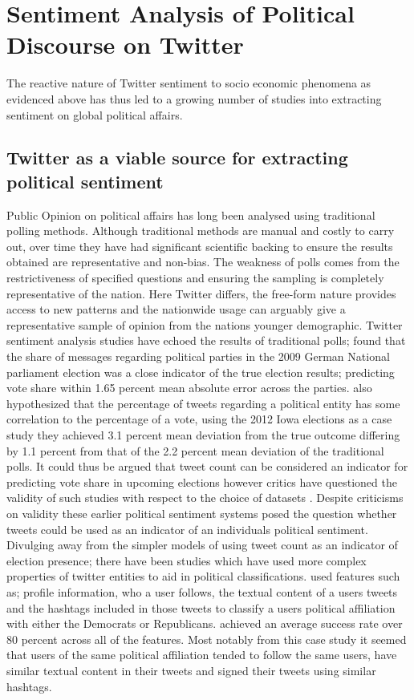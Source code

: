 \documentclass[11pt]{report}
\begin{document}
\section{Sentiment Analysis of Political Discourse on Twitter}
The reactive nature of Twitter sentiment to socio economic phenomena as evidenced above has thus led to a growing number of studies into extracting sentiment on global political affairs.
\subsection*{Twitter as a viable source for extracting political sentiment}
Public Opinion on political affairs has long been analysed using traditional polling methods. Although traditional methods are manual and costly to carry out, over time they have had significant scientific backing to ensure the results obtained are representative and non-bias. The weakness of polls comes from the restrictiveness of specified questions and ensuring the sampling is completely representative of the nation. Here Twitter differs, the free-form nature provides access to new patterns and the nationwide usage can arguably give a representative sample of opinion from the nations younger demographic. Twitter sentiment analysis studies have echoed the results of traditional polls; \cite{tumasjan_predicting_2010} found that the share of messages regarding political parties in the 2009 German National parliament election was a close indicator of the true election results; predicting vote share within 1.65 percent mean absolute error across the parties.  \cite{jensen_psephological_2013} also hypothesized that the percentage of tweets regarding a political entity has some correlation to the percentage of a vote, using the 2012 Iowa elections as a case study they achieved 3.1 percent mean deviation from the true outcome differing by 1.1 percent from that of the 2.2 percent mean deviation of the traditional polls. It could thus be argued that tweet count can be considered an indicator for predicting vote share in upcoming elections however critics have questioned the validity of such studies with respect to the choice of datasets \citep{andreas_jungherr_why_2012}. Despite criticisms on validity these earlier political sentiment systems posed the question whether tweets could be used as an indicator of an individuals political sentiment. Divulging away from the simpler models of using tweet count as an indicator of election presence; there have been studies which have used more complex properties of twitter entities to aid in political classifications. \cite{pennacchiotti_machine_2011} used features such as; profile information, who a user follows, the textual content of a users tweets and the hashtags included in those tweets to classify a users political affiliation with either the Democrats or Republicans. \cite{pennacchiotti_machine_2011} achieved an average success rate over 80 percent across all of the features. Most notably from this case study it seemed that users of the same political affiliation tended to follow the same users, have similar textual content in their tweets and signed their tweets using similar hashtags.
\end{document}
